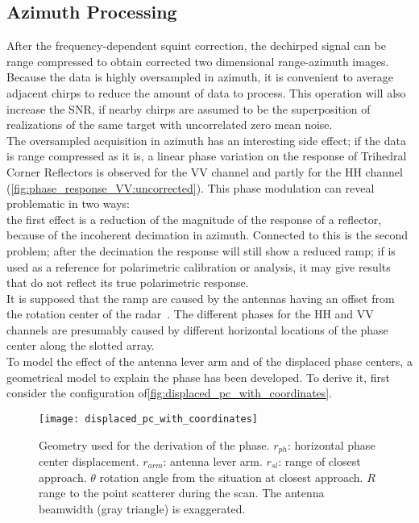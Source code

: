 \subsection{Azimuth Processing}
After the frequency-dependent squint correction, the dechirped signal can be range compressed to obtain corrected two dimensional range-azimuth images. Because the data is highly oversampled in azimuth, it is convenient to average adjacent chirps to reduce the amount of data to process. This operation will also  increase the SNR, if nearby chirps are assumed to be the superposition of realizations of the same target with uncorrelated zero mean noise.\\
The oversampled acquisition in azimuth has an interesting side effect;
if the data is range compressed as it is, a linear phase variation on the response of Trihedral Corner Reflectors is observed for the VV channel and partly for the HH channel (\autoref{fig:phase_response_VV:uncorrected}). This phase modulation can reveal problematic in two ways:\\ the first effect is a reduction of the magnitude of the response of a reflector, because of the incoherent decimation in azimuth. Connected to this is the second problem; after the decimation the response will still show a reduced ramp; if is used  as a reference for polarimetric calibration or analysis, it may give results that do not reflect its true polarimetric response.\\
It is supposed that the ramp are caused by the antennas having an offset from the rotation center of the radar~\cite{Lee2014}. The different phases for the HH and VV channels are presumably caused by different horizontal locations of the phase center along the slotted array.\\
To model the effect of the antenna lever arm and of the displaced phase centers, a geometrical model to explain the phase has been developed. To derive it, first consider the configuration of\autoref{fig:displaced_pc_with_coordinates}.
\begin{figure}[ht]
	\centering
	\texttt{[image: displaced\_pc\_with\_coordinates]}
	\caption{Geometry used for the derivation of the phase. $r_{ph}$: horizontal phase center displacement. $r_{arm}$: antenna lever arm. $r_{sl}$: range of closest approach. $\theta$ rotation angle from the situation at closest approach. $R$ range to the point scatterer during the scan. The antenna beamwidth (gray triangle) is exaggerated.}
	\label{fig:displaced_pc_with_coordinates}
\end{figure}
